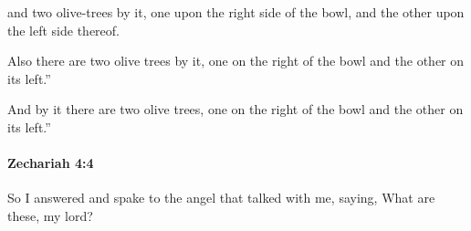 			\begin{versebox}
					\item[BHS] 
					\item[LXX] 
					\item[ASV] and two olive-trees by it, one upon the right side of the bowl, and the other upon the left side thereof.
					\item[NIV] Also there are two olive trees by it, one on the right of the bowl and the other on its left.”
					\item[NRSV] And by it there are two olive trees, one on the right of the bowl and the other on its left.”
			\end{versebox}

		\paragraph{Zechariah 4:4} %
			\label{ZECHARIAH-4-4}

			So I answered and spake to the angel that talked with me, saying, What are these, my lord?

